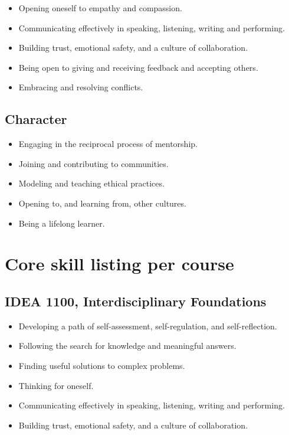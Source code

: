 \documentclass[letterpaper,10pt,headsepline]{scrreprt}
\begin{document}
\begin{itemize}
\itemsep1pt\parskip0pt
\item
  Opening oneself to empathy and compassion.
\item
  Communicating effectively in speaking, listening, writing and
  performing.
\item
  Building trust, emotional safety, and a culture of collaboration.
\item
  Being open to giving and receiving feedback and accepting others.
\item
  Embracing and resolving conflicts.
\end{itemize}

\subsection{Character}

\begin{itemize}
\itemsep1pt\parskip0pt
\item
  Engaging in the reciprocal process of mentorship.
\item
  Joining and contributing to communities.
\item
  Modeling and teaching ethical practices.
\item
  Opening to, and learning from, other cultures.
\item
  Being a lifelong learner.
\end{itemize}

\section{Core skill listing per course}

\subsection{IDEA 1100, Interdisciplinary Foundations}

\begin{itemize}
\itemsep1pt\parskip0pt
\item
  Developing a path of self-assessment, self-regulation, and
  self-reflection.
\item
  Following the search for knowledge and meaningful answers.
\item
  Finding useful solutions to complex problems.
\item
  Thinking for oneself.
\item
  Communicating effectively in speaking, listening, writing and
  performing.
\item
  Building trust, emotional safety, and a culture of collaboration.
\end{itemize}
\end{document}
